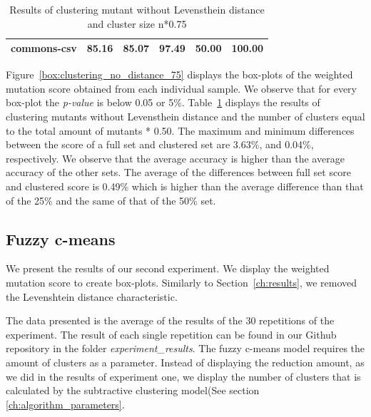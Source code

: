 \documentclass[conference,draftclsnofoot,onecolumn]{IEEEtran}
\begin{document}
\begin{table}[ht]
\begin{tabular}{|l|c|c|c|c|c|}
commons-csv                   & 85.16                                                                                 & 85.07                                                                                     & 97.49                                                                              & 50.00                                                                               & 100.00                                                                             \\ \hline
\end{tabular}
\caption{\label{tab:clustering_no_distance_75}Results of clustering mutant without Levensthein distance and cluster size n*0.75}
\end{table}

Figure~\ref{box:clustering_no_distance_75} displays the box-plots of the weighted mutation score obtained from each individual sample. 
We observe that for every box-plot the \textit{p-value} is below 0.05 or 5\%.
Table~\ref{tab:clustering_no_distance_75} displays the results of clustering mutants without Levensthein distance and the number of clusters equal to the total amount of mutants * 0.50.
The maximum and minimum differences between the score of a full set and clustered set are 3.63\%, and 0.04\%, respectively.
We observe that the average accuracy is higher than the average accuracy of the other sets.
The average of the differences between full set score and clustered score is  0.49\% which is higher than the average difference than that of the 25\% and the same of that of the 50\% set.

\subsection{Fuzzy c-means}
\label{ch:results_rq2}
We present the results of our second experiment.
We display the weighted mutation score to create box-plots.
Similarly to Section~\ref{ch:results}, we removed the Levenshtein distance characteristic.

The data presented is the average of the results of the 30 repetitions of the experiment.
The result of each single repetition can be found in our Github repository in the folder \textit{experiment{\_}results}\cite{rbasarat-repo}.
The fuzzy c-means model requires the amount of clusters as a parameter.
Instead of displaying the reduction amount, as we did in the results of experiment one, we display the number of clusters that is calculated by the subtractive clustering model(See section \ref{ch:algorithm_parameters}.
\end{document}

